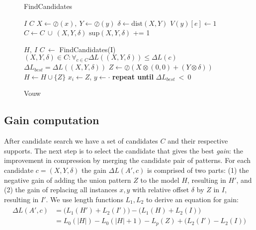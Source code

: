 \documentclass{llncs}
\begin{document}
\begin{figure*}[t!]
\vspace{-\baselineskip}
\begin{minipage}[t]{.45\textwidth}
	\begin{algorithm}[H]
	\caption{FindCandidates}
	\begin{algorithmic}[1]
	\Require $I$
	\Ensure $C$
			\State $X \gets \oslash(x), \ Y \gets \oslash(y)$
			\State $\delta \gets \mathrm{dist}(X,Y)$
				\State $V(y)[e] \gets 1$
			\EndIf
			\State $C \gets C \ \cup \ (X,Y,\delta)$
			\State $\mathrm{sup}(X,Y,\delta)$ += 1
		\EndFor
	\EndFor
	\end{algorithmic}
	\end{algorithm}%
\end{minipage}%
\begin{minipage}[t]{.55\textwidth}
	\begin{algorithm}[H]
	\caption{Vouw}
	\label{alg:vouw}
	\begin{algorithmic}[1]
	\Require $H,\ I$
		\State $C \ \gets$ FindCandidates(I)
		\State $(X,Y,\delta) \in C : \forall_{c \in C} \Delta L((X,Y,\delta)) \leq \Delta L(c)$
	\State $\Delta L_{best} = \Delta L((X,Y,\delta))$
		\State $Z \gets \oslash(X\otimes(0,0) + (Y\otimes\delta))$
		\State $H \gets H \cup \{Z\}$
				\State $x_i \gets Z$,  $y \gets \cdot$
			\EndFor
		\EndFor
	\EndIf
	\State \textbf{repeat until} $\Delta L_{best} \ < \ 0$
	\end{algorithmic}%
	\vspace{-1.75pt}
	\end{algorithm}
\end{minipage}
\end{figure*}

\subsection{Gain computation}

After candidate search we have a set of candidates $C$ and their respective supports. The next step is to select the candidate that gives the best \emph{gain}: the improvement in compression by merging the candidate pair of patterns. For each candidate $c=(X,Y,\delta)$ the gain $\Delta L(A',c)$  is comprised of two parts: (1) the negative gain of adding the union pattern $Z$ to the model $H$, resulting in $H'$, and (2) the gain of replacing all instances $x,y$ with relative offset $\delta$ by $Z$ in $I$, resulting in $I'$. We use length functions $L_1, L_2$ to derive an equation for gain:
\begin{align}
\label{gain}
\begin{split}
	\Delta L(A',c) &= \Big(L_1(H') + L_2(I') \Big) - \Big(L_1(H) + L_2(I) \Big) \\
			    &= L_0(|H|) - L_0(|H|+1) - L_p(Z) + \Big(L_2(I') - L_2(I) \Big)
\end{split}
\end{align}
\end{document}
